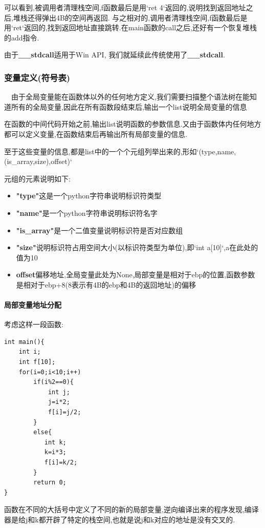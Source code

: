 \documentclass{article}
\begin{document}
可以看到,被调用者清理栈空间,f函数最后是用`ret 4`返回的,说明找到返回地址之后,堆栈还得弹出4B的空间再返回.
与之相对的,调用者清理栈空间,f函数最后是用`ret`返回的,找到返回地址直接跳转.在main函数的call之后,还好有一个恢复堆栈的add指令.

由于\textbf{\_\_stdcall}适用于Win API, 我们就延续此传统使用了\textbf{\_\_stdcall}.

\subsubsection{变量定义(符号表)}

\quad\ \ 由于全局变量能在函数体以外的任何地方定义,我们需要扫描整个语法树在能知道所有的全局变量,因此在所有函数段结束后,输出一个list说明全局变量的信息


在函数的中间代码开始之前,输出list说明函数的参数信息.又由于函数体内任何地方都可以定义变量,在函数结束后再输出所有局部变量的信息.

至于这些变量的信息,都是list中的一个个元组列举出来的,形如`(type,name,(is\_array,size),offset)`

元组的元素说明如下:
\begin{itemize}
\item \textbf{"type"}这是一个python字符串说明标识符类型
\item \textbf{"name"}是一个python字符串说明标识符名字
\item \textbf{"is\_array"}是一个二值变量说明标识符是否对应数组
\item \textbf{"size"}说明标识符占用空间大小(以标识符类型为单位),即`int a[10]`,a在此处的值为10
\item \textbf{offset}偏移地址,全局变量此处为None,局部变量是相对于ebp的位置,函数参数是相对于ebp+8(8表示有4B的ebp和4B的返回地址)的偏移
\end{itemize}

\paragraph{局部变量地址分配}

考虑这样一段函数:

\begin{verbatim}
int main(){
    int i;
    int f[10];
    for(i=0;i<10;i++)
        if(i%2==0){
            int j;
            j=i*2;
            f[i]=j/2;
        }
        else{
           int k;
           k=i*3;
           f[i]=k/2;
        }
        return 0;
}
\end{verbatim}

函数在不同的大括号中定义了不同的新的局部变量,逆向编译出来的程序发现,编译器是给j和k都开辟了特定的栈空间,也就是说j和k对应的地址是没有交叉的.
\end{document}
